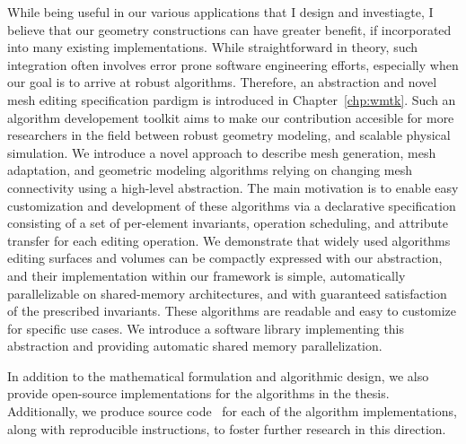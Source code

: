 While being useful in our various applications that I design and investiagte, I believe that our geometry constructions can have greater benefit, if incorporated into many existing implementations. While straightforward in theory, such integration often involves error prone software engineering efforts, especially when our goal is to arrive at robust algorithms. Therefore, an abstraction and novel mesh editing specification pardigm is introduced in Chapter~\ref*{chp:wmtk}. Such an algorithm developement toolkit aims to make our contribution accesible for more researchers in the field between robust geometry modeling, and scalable physical simulation.
We introduce a novel approach to describe mesh generation, mesh adaptation, and geometric modeling algorithms relying on changing mesh connectivity using a high-level abstraction. The main motivation is to enable easy customization and development of these algorithms via a declarative specification consisting of a set of per-element invariants, operation scheduling, and attribute transfer for each editing operation.
We demonstrate that widely used algorithms editing surfaces and volumes can be compactly expressed with our abstraction, and their implementation within our framework is simple, automatically parallelizable on shared-memory architectures, and with guaranteed satisfaction of the prescribed invariants. These algorithms are readable and easy to customize for specific use cases.
We introduce a software library implementing this abstraction and providing automatic shared memory parallelization.

In addition to the mathematical formulation and algorithmic design, we also provide open-source implementations for the algorithms in the thesis.
Additionally, we produce source code~\cite{githubScaffoldMap,githubshell,githubbichon} for each of the algorithm implementations, along with reproducible instructions, to foster further research in this direction.
